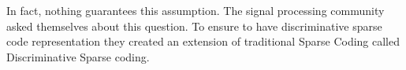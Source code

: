 \begin{center}
\end{center}
 In fact, nothing guarantees this assumption.  The signal processing community asked themselves about this question. To ensure to have discriminative sparse code representation they created an extension of traditional Sparse Coding called Discriminative Sparse coding.
% 
% 
% 
% 
